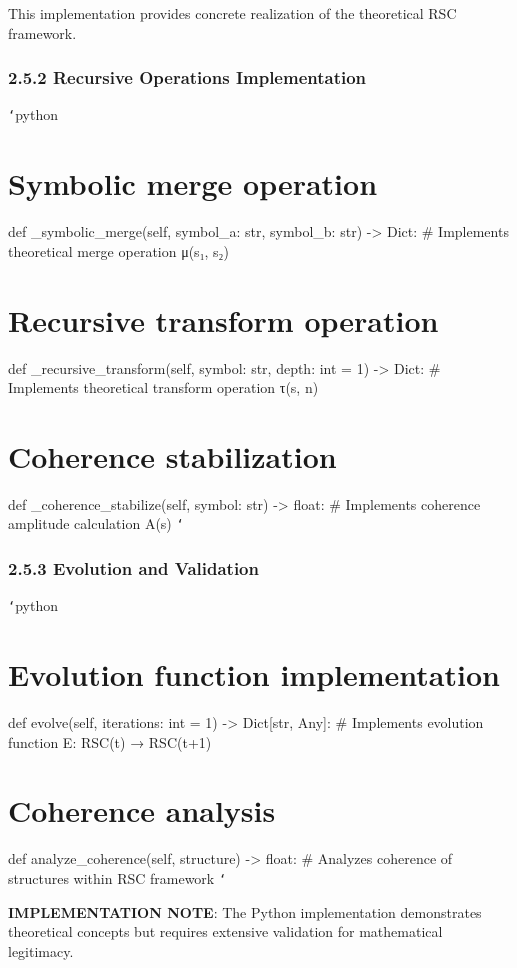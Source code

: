 This implementation provides concrete realization of the theoretical RSC framework.

\subsection{2.5.2 Recursive Operations Implementation}

\texttt{`}python
\chapter{Symbolic merge operation}
def _symbolic_merge(self, symbol_a: str, symbol_b: str) -> Dict:
    \# Implements theoretical merge operation μ(s₁, s₂)
    
\chapter{Recursive transform operation  }
def _recursive_transform(self, symbol: str, depth: int = 1) -> Dict:
    \# Implements theoretical transform operation τ(s, n)
    
\chapter{Coherence stabilization}
def _coherence_stabilize(self, symbol: str) -> float:
    \# Implements coherence amplitude calculation A(s)
\texttt{`}

\subsection{2.5.3 Evolution and Validation}

\texttt{`}python
\chapter{Evolution function implementation}
def evolve(self, iterations: int = 1) -> Dict[str, Any]:
    \# Implements evolution function E: RSC(t) → RSC(t+1)
    
\chapter{Coherence analysis}
def analyze_coherence(self, structure) -> float:
    \# Analyzes coherence of structures within RSC framework
\texttt{`}

\textbf{IMPLEMENTATION NOTE}: The Python implementation demonstrates theoretical concepts but requires extensive validation for mathematical legitimacy.

